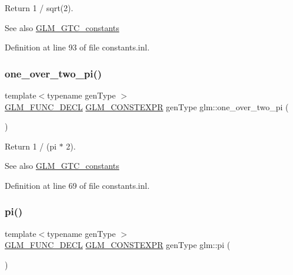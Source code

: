 Return 1 / sqrt(2). \begin{DoxySeeAlso}{See also}
\mbox{\hyperlink{group__gtc__constants}{G\+L\+M\+\_\+\+G\+T\+C\+\_\+constants}} 
\end{DoxySeeAlso}


Definition at line 93 of file constants.\+inl.

\mbox{\label{group__gtc__constants_ga7c922b427986cbb2e4c6ac69874eefbc}} 
\subsubsection{\texorpdfstring{one\_over\_two\_pi()}{one\_over\_two\_pi()}}
{\footnotesize\ttfamily template$<$typename gen\+Type $>$ \\
\mbox{\hyperlink{setup_8hpp_ab2d052de21a70539923e9bcbf6e83a51}{G\+L\+M\+\_\+\+F\+U\+N\+C\+\_\+\+D\+E\+CL}} \mbox{\hyperlink{setup_8hpp_a08b807947b47031d3a511f03f89645ad}{G\+L\+M\+\_\+\+C\+O\+N\+S\+T\+E\+X\+PR}} gen\+Type glm\+::one\+\_\+over\+\_\+two\+\_\+pi (\begin{DoxyParamCaption}{ }\end{DoxyParamCaption})}

Return 1 / (pi $\ast$ 2). \begin{DoxySeeAlso}{See also}
\mbox{\hyperlink{group__gtc__constants}{G\+L\+M\+\_\+\+G\+T\+C\+\_\+constants}} 
\end{DoxySeeAlso}


Definition at line 69 of file constants.\+inl.

\mbox{\label{group__gtc__constants_ga94bafeb2a0f23ab6450fed1f98ee4e45}} 
\subsubsection{\texorpdfstring{pi()}{pi()}}
{\footnotesize\ttfamily template$<$typename gen\+Type $>$ \\
\mbox{\hyperlink{setup_8hpp_ab2d052de21a70539923e9bcbf6e83a51}{G\+L\+M\+\_\+\+F\+U\+N\+C\+\_\+\+D\+E\+CL}} \mbox{\hyperlink{setup_8hpp_a08b807947b47031d3a511f03f89645ad}{G\+L\+M\+\_\+\+C\+O\+N\+S\+T\+E\+X\+PR}} gen\+Type glm\+::pi (\begin{DoxyParamCaption}{ }\end{DoxyParamCaption})}

